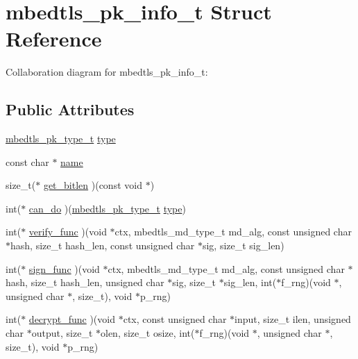 \hypertarget{structmbedtls__pk__info__t}{}\section{mbedtls\+\_\+pk\+\_\+info\+\_\+t Struct Reference}
\label{structmbedtls__pk__info__t}


Collaboration diagram for mbedtls\+\_\+pk\+\_\+info\+\_\+t\+:
\subsection*{Public Attributes}
\begin{DoxyCompactItemize}
\item 
\mbox{\hyperlink{pk_8h_a3fe41eff5605ae727eb9d28dad297020}{mbedtls\+\_\+pk\+\_\+type\+\_\+t}} \mbox{\hyperlink{structmbedtls__pk__info__t_a1290aa516e4b5889952f56edf331c313}{type}}
\item 
const char $\ast$ \mbox{\hyperlink{structmbedtls__pk__info__t_a6390c0e7c7597efec2033fcbea53697c}{name}}
\item 
size\+\_\+t($\ast$ \mbox{\hyperlink{structmbedtls__pk__info__t_ab024ac521ddf1ea0837df0a88a0a4e19}{get\+\_\+bitlen}} )(const void $\ast$)
\item 
int($\ast$ \mbox{\hyperlink{structmbedtls__pk__info__t_af64d12bcc605260ebfbd24a8c6258e1f}{can\+\_\+do}} )(\mbox{\hyperlink{pk_8h_a3fe41eff5605ae727eb9d28dad297020}{mbedtls\+\_\+pk\+\_\+type\+\_\+t}} \mbox{\hyperlink{structmbedtls__pk__info__t_a1290aa516e4b5889952f56edf331c313}{type}})
\item 
int($\ast$ \mbox{\hyperlink{structmbedtls__pk__info__t_aba8b768e152806bc28322004a522dc0c}{verify\+\_\+func}} )(void $\ast$ctx, mbedtls\+\_\+md\+\_\+type\+\_\+t md\+\_\+alg, const unsigned char $\ast$hash, size\+\_\+t hash\+\_\+len, const unsigned char $\ast$sig, size\+\_\+t sig\+\_\+len)
\item 
int($\ast$ \mbox{\hyperlink{structmbedtls__pk__info__t_a22d9de47693a6f2368d66d7d66db8093}{sign\+\_\+func}} )(void $\ast$ctx, mbedtls\+\_\+md\+\_\+type\+\_\+t md\+\_\+alg, const unsigned char $\ast$hash, size\+\_\+t hash\+\_\+len, unsigned char $\ast$sig, size\+\_\+t $\ast$sig\+\_\+len, int($\ast$f\+\_\+rng)(void $\ast$, unsigned char $\ast$, size\+\_\+t), void $\ast$p\+\_\+rng)
\item 
int($\ast$ \mbox{\hyperlink{structmbedtls__pk__info__t_a32ef1fda6aedac78d5a28af612531162}{decrypt\+\_\+func}} )(void $\ast$ctx, const unsigned char $\ast$input, size\+\_\+t ilen, unsigned char $\ast$output, size\+\_\+t $\ast$olen, size\+\_\+t osize, int($\ast$f\+\_\+rng)(void $\ast$, unsigned char $\ast$, size\+\_\+t), void $\ast$p\+\_\+rng)

\end{DoxyCompactItemize}
